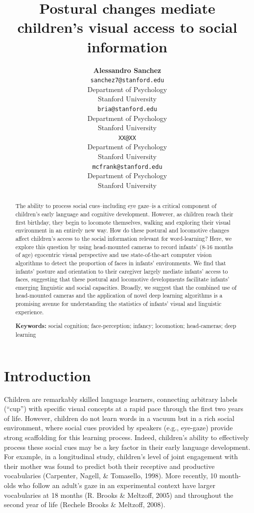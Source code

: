 \documentclass[10pt, letterpaper]{article}
\title{Postural changes mediate children's visual access to social information}
\author{{\large \bf Alessandro Sanchez} \\ \texttt{sanchez7@stanford.edu} \\ Department of Psychology \\ Stanford University \And {\large \bf Bria Long} \\ \texttt{bria@stanford.edu} \\ Department of Psychology \\ Stanford University
    \And {\large \bf Ally Kraus} \\ \texttt{XX@XX} \\ Department of Psychology \\ Stanford University
    \And {\large \bf Michael C. Frank} \\ \texttt{mcfrank@stanford.edu} \\ Department of Psychology \\ Stanford University}
\begin{document}
\maketitle

\begin{abstract}
The ability to process social cues--including eye gaze--is a critical
component of children's early language and cognitive development.
However, as children reach their first birthday, they begin to locomote
themselves, walking and exploring their visual environment in an
entirely new way. How do these postural and locomotive changes affect
children's access to the social information relevant for word-learning?
Here, we explore this question by using head-mounted cameras to record
infants' (8-16 months of age) egocentric visual perspective and use
state-of-the-art computer vision algorithms to detect the proportion of
faces in infants' environments. We find that infants' posture and
orientation to their caregiver largely mediate infants' access to faces,
suggesting that these postural and locomotive developments facilitate
infants' emerging linguistic and social capacities. Broadly, we suggest
that the combined use of head-mounted cameras and the application of
novel deep learning algorithms is a promising avenue for understanding
the statistics of infants' visual and linguistic experience.

\textbf{Keywords:}
social cognition; face-perception; infancy; locomotion; head-cameras;
deep learning
\end{abstract}

\section{Introduction}\label{introduction}

Children are remarkably skilled language learners, connecting arbitrary
labels (``cup'') with specific visual concepts at a rapid pace through
the first two years of life. However, children do not learn words in a
vacuum but in a rich social environment, where social cues provided by
speakers (e.g., eye-gaze) provide strong scaffolding for this learning
process. Indeed, children's ability to effectively process these social
cues may be a key factor in their early language development. For
example, in a longitudinal study, children's level of joint engagement
with their mother was found to predict both their receptive and
productive vocabularies (Carpenter, Nagell, \& Tomasello, 1998). More
recently, 10 month-olds who follow an adult's gaze in an experimental
context have larger vocabularies at 18 months (R. Brooks \& Meltzoff,
2005) and throughout the second year of life (Rechele Brooks \&
Meltzoff, 2008).
\end{document}
